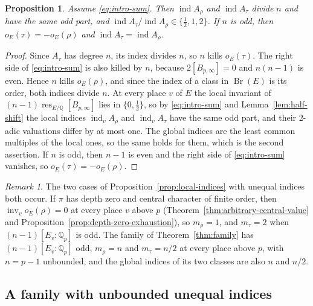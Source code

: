\documentclass[a4paper,11pt]{amsart}
\newtheorem{proposition}[theorem]{Proposition}
\theoremstyle{definition}
\theoremstyle{remark}
\newtheorem{remark}[theorem]{Remark}
\numberwithin{equation}{section}
\newcommand{\Q}{\mathbb{Q}}
\DeclareMathOperator{\Br}{Br}
\DeclareMathOperator{\inv}{inv}
\DeclareMathOperator{\res}{res}
\DeclareMathOperator{\ind}{ind}
\newcommand{\Bpinf}{B_{p,\infty}}
\begin{document}
\begin{proposition}\label{prop:global-indices}
Assume \eqref{eq:intro-sum}. Then $\ind A_\rho$ and $\ind A_\tau$ divide $n$ and have the same odd part, and $\ind A_\tau/\ind A_\rho\in\{\tfrac12,1,2\}$. If $n$ is odd, then $o_E(\tau)=-o_E(\rho)$ and $\ind A_\tau=\ind A_\rho$.
\end{proposition}

\begin{proof}
Since $A_\tau$ has degree $n$, its index divides $n$, so $n$ kills $o_E(\tau)$. The right side of \eqref{eq:intro-sum} is also killed by $n$, because $2[\Bpinf]=0$ and $n(n-1)$ is even. Hence $n$ kills $o_E(\rho)$, and since the index of a class in $\Br(E)$ is its order, both indices divide $n$. At every place $v$ of $E$ the local invariant of $(n-1)\res_{E/\Q}[\Bpinf]$ lies in $\{0,\frac12\}$, so by \eqref{eq:intro-sum} and Lemma~\ref{lem:half-shift} the local indices $\ind_v A_\rho$ and $\ind_v A_\tau$ have the same odd part, and their $2$-adic valuations differ by at most one. The global indices are the least common multiples of the local ones, so the same holds for them, which is the second assertion. If $n$ is odd, then $n-1$ is even and the right side of \eqref{eq:intro-sum} vanishes, so $o_E(\tau)=-o_E(\rho)$.
\end{proof}

\begin{remark}\label{rem:cases-occur}
The two cases of Proposition~\ref{prop:local-indices} with unequal indices both occur. If $\pi$ has depth zero and central character of finite order, then $\inv_v o_E(\rho)=0$ at every place $v$ above $p$ (Theorem~\ref{thm:arbitrary-central-value} and Proposition~\ref{prop:depth-zero-exhaustion}), so $m_\rho=1$, and $m_\tau=2$ when $(n-1)[E_v:\Q_p]$ is odd. The family of Theorem~\ref{thm:family} has $(n-1)[E_v:\Q_p]$ odd, $m_\rho=n$ and $m_\tau=n/2$ at every place above $p$, with $n=p-1$ unbounded, and the global indices of its two classes are also $n$ and $n/2$.
\end{remark}

\subsection{A family with unbounded unequal indices}\label{subsec:family}
\end{document}
